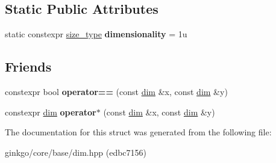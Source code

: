 \subsection*{Static Public Attributes}
\begin{DoxyCompactItemize}
\item 
\mbox{\label{structgko_1_1dim_3_011u_00_01DimensionType_01_4_af991219c5c0f3b362f205a239767f3a3}} 
static constexpr \hyperlink{namespacegko_a6e5c95df0ae4e47aab2f604a22d98ee7}{size\+\_\+type} {\bfseries dimensionality} = 1u
\end{DoxyCompactItemize}
\subsection*{Friends}
\begin{DoxyCompactItemize}
\item 
\mbox{\label{structgko_1_1dim_3_011u_00_01DimensionType_01_4_a5e2c1e99f1c12540aac8489127c5dfb6}} 
constexpr bool {\bfseries operator==} (const \hyperlink{structgko_1_1dim}{dim} \&x, const \hyperlink{structgko_1_1dim}{dim} \&y)
\item 
\mbox{\label{structgko_1_1dim_3_011u_00_01DimensionType_01_4_a27d25e410396817b4ceafbae3d5df5c8}} 
constexpr \hyperlink{structgko_1_1dim}{dim} {\bfseries operator$\ast$} (const \hyperlink{structgko_1_1dim}{dim} \&x, const \hyperlink{structgko_1_1dim}{dim} \&y)
\end{DoxyCompactItemize}


The documentation for this struct was generated from the following file\+:\begin{DoxyCompactItemize}
\item 
ginkgo/core/base/dim.\+hpp (edbc7156)\end{DoxyCompactItemize}
